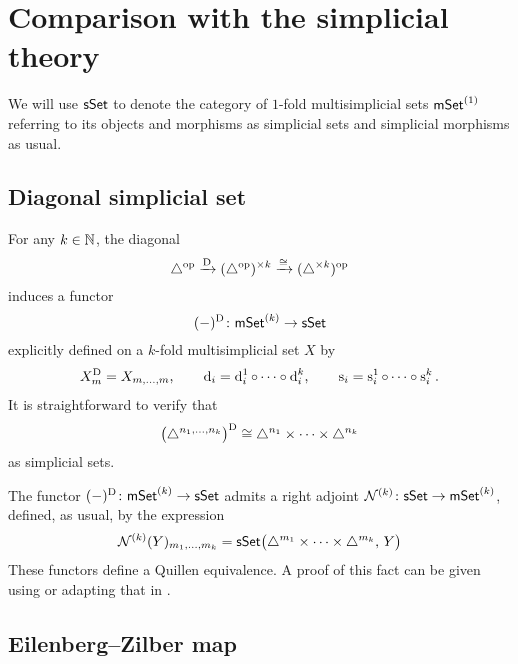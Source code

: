 
\section{Comparison with the simplicial theory}\label{s:comparison}

We will use $\mathsf{sSet}$ to denote the category of $1$-fold multisimplicial sets $\mathsf{mSet}^{(1)}$ referring to its objects and morphisms as simplicial sets and simplicial morphisms as usual.

\subsection{Diagonal simplicial set}\label{ss:diagonal}

For any $k \in \mathbb{N}$, the diagonal
\[
\triangle^{\mathrm{op}} \xrightarrow{\mathrm{D}}
(\triangle^{\mathrm{op}})^{\times k} \xrightarrow{\cong}
(\triangle^{\times k})^{\mathrm{op}}
\]
induces a functor
\[
(-)^{\mathrm{D}} \colon \mathsf{mSet}^{(k)} \to \mathsf{sSet}
\]
explicitly defined on a $k$-fold multisimplicial set $X$ by
\begin{gather*}
	X^{\mathrm{D}}_m = X_{m, \dots, m},
	\qquad
	\operatorname{d}_i = \operatorname{d}_i^1 \circ \dots \circ \operatorname{d}_i^k,
	\qquad
	\operatorname{s}_i = \operatorname{s}_i^1 \circ \dots \circ \operatorname{s}_i^k.
\end{gather*}
It is straightforward to verify that
\[
\big(\triangle^{n_1,\dots,n_k}\big)^{\mathrm{D}} \cong
\triangle^{n_1}\times\dots\times\triangle^{n_k}
\]
as simplicial sets.

The functor $(-)^{\mathrm{D}} \colon \mathsf{mSet}^{(k)} \to \mathsf{sSet}$ admits a right adjoint $\mathcal{N}^{(k)} \colon \mathsf{sSet} \to \mathsf{mSet}^{(k)}$, defined, as usual, by the expression
\[
\mathcal{N}^{(k)}(Y)_{m_1,\dots,m_k} =
\mathsf{sSet}\big( \triangle^{m_1} \times \dots \times \triangle^{m_k}, \, Y \big)
\]
These functors define a Quillen equivalence.
A proof of this fact can be given using \cite[Proposition~1.6.8]{maltsiniotis2005grothendieck} or adapting that in \cite[Proposition~1.2]{moerdijk1989bisimplicialsets}.

\subsection{Eilenberg--Zilber map}\label{ss:eilenber-zilber}

